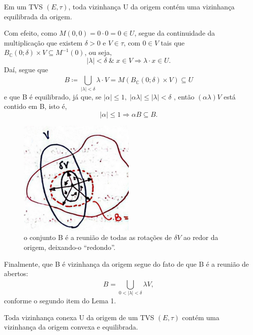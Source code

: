\documentclass[../distribution_theory_notes.tex]{subfiles}
\begin{document}
\begin{theorem*}
  Em um TVS \((E, \tau )\), toda vizinhança U da origem contém uma vizinhança equilibrada da origem.
\end{theorem*}
\begin{proof*}
  Com efeito, como \(M(0, 0)=0 \cdot 0 = 0\in U\), segue da continuidade da multiplicação que existem \(\delta > 0\) e \(V\in \tau \), com \(0\in V\) tais que \(B_{\mathbb{C}}(0; \delta )\times V\subseteq M^{-1}(0)\), ou seja, 
    \[
      |\lambda |<\delta \;\&\; x\in V \Rightarrow \lambda \cdot x\in U.
    \]
    Daí, segue que 
      \[
        B\coloneqq \bigcup_{|\lambda |<\delta }^{}\lambda \cdot V=M(B_{\mathbb{C}}(0; \delta ) \times V) \subseteq U
      \]
      e que B é equilibrado, já que, se \(|\alpha |\leq 1,\; |\alpha \lambda |\leq |\lambda |<\delta \) , então \((\alpha \lambda )V\) está contido em B, isto é, 
        \[
          |\alpha |\leq 1 \Rightarrow \alpha B \subseteq B.
        \] 
 \begin{figure}[H]
 \begin{center}
 \includegraphics[height=0.5\textheight, width=0.5\textwidth, keepaspectratio]{./Images/open_union_2.png}
 \end{center}
 \caption{o conjunto B é a reunião de todas as rotações de \(\delta V\) ao redor da origem, deixando-o ``redondo''.}
 \end{figure} 

  Finalmente, que B é vizinhança da origem segue do fato de que B é a reunião de abertos: 
    \[
      B = \bigcup_{0<|\lambda |<\delta }^{}\lambda V,
    \]
    conforme o segundo item do Lema 1. 
\end{proof*}
\begin{theorem*}
  Toda vizinhança conexa U da origem de um TVS \((E, \tau )\) contém uma vizinhança da origem convexa e equilibrada.
\end{theorem*}
\end{document}
